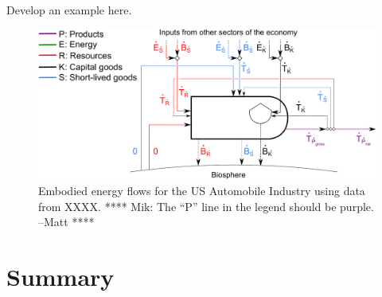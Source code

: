 Develop an example here.

\begin{figure}[h!]
\centering
\includegraphics[width=0.8\linewidth]{Part_2/Chapter_Embodied/images/PERKS_basic_unit_embodied_energy_content_auto_ind.pdf}
\caption{Embodied energy flows for the US Automobile Industry using data from XXXX. 
**** Mik: The ``P'' line in the legend should be purple. --Matt ****}
\label{fig:PERKS_energy_auto}
\end{figure}

\section{Summary}
\label{sec:embodied_energy_summary}








%
%

